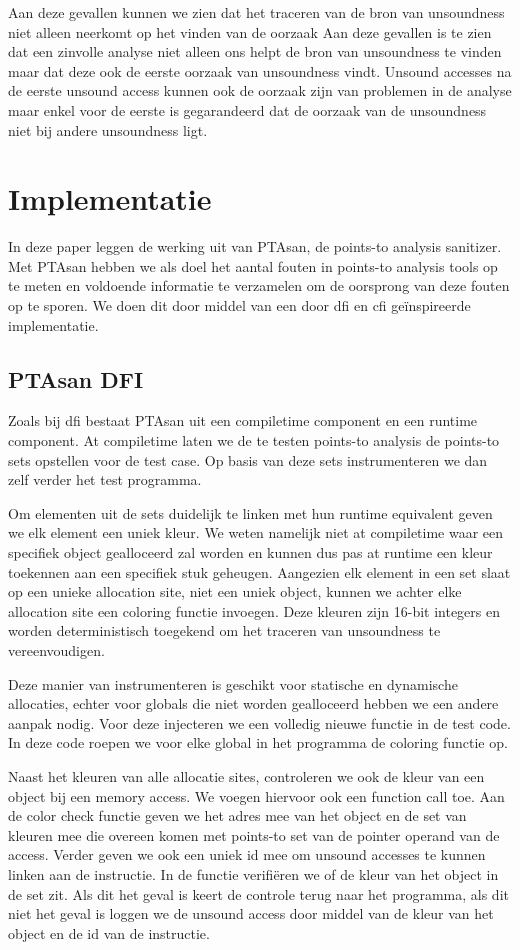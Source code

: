 \documentclass[conference]{IEEEtran}
\begin{document}
Aan deze gevallen kunnen we zien dat het traceren van de bron van unsoundness niet alleen neerkomt op het vinden van de oorzaak 
Aan deze gevallen is te zien dat een zinvolle analyse niet alleen ons helpt de bron van unsoundness te vinden maar dat deze ook de eerste oorzaak van unsoundness vindt. Unsound accesses na de eerste unsound access kunnen ook de oorzaak zijn van problemen in de analyse maar enkel voor de eerste is gegarandeerd dat de oorzaak van de unsoundness niet bij andere unsoundness ligt.


\section{Implementatie}
In deze paper leggen de werking uit van PTAsan, de points-to analysis sanitizer. Met PTAsan hebben we als doel het aantal fouten in points-to analysis tools op te meten en voldoende informatie te verzamelen om de oorsprong van deze fouten op te sporen. We doen dit door middel van een door \gls{dfi} en \gls{cfi} geïnspireerde implementatie.

\subsection{PTAsan DFI}
Zoals bij \gls{dfi} bestaat PTAsan uit een compiletime component en een runtime component. At compiletime laten we de te testen points-to analysis de points-to sets opstellen voor de test case. Op basis van deze sets instrumenteren we dan zelf verder het test programma. 

Om elementen uit de sets duidelijk te linken met hun runtime equivalent geven we elk element een uniek kleur. We weten namelijk niet at compiletime waar een specifiek object gealloceerd zal worden en kunnen dus pas at runtime een kleur toekennen aan een specifiek stuk geheugen. Aangezien elk element in een set slaat op een unieke allocation site, niet een uniek object, kunnen we achter elke allocation site een coloring functie invoegen. Deze kleuren zijn 16-bit integers en worden deterministisch toegekend om het traceren van unsoundness te vereenvoudigen.

Deze manier van instrumenteren is geschikt voor statische en dynamische allocaties, echter voor globals die niet worden gealloceerd hebben we een andere aanpak nodig. Voor deze injecteren we een volledig nieuwe functie in de test code. In deze code roepen we voor elke global in het programma de coloring functie op. 

Naast het kleuren van alle allocatie sites, controleren we ook de kleur van een object bij een memory access. We voegen hiervoor ook een function call toe. Aan de color check functie geven we het adres mee van het object en de set van kleuren mee die overeen komen met points-to set van de pointer operand van de access. Verder geven we ook een uniek id mee om unsound accesses te kunnen linken aan de instructie. In de functie verifiëren we of de kleur van het object in de set zit. Als dit het geval is keert de controle terug naar het programma, als dit niet het geval is loggen we de unsound access door middel van de kleur van het object en de id van de instructie.
\end{document}
